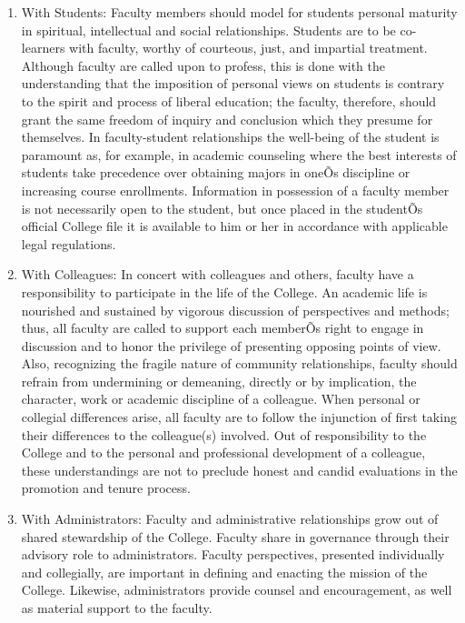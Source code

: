 \documentclass[letterpaper, 11pt]{article}
\begin{document}
				\begin{enumerate}[label=\alph*)]
					\item{With Students:  Faculty members should model for students personal maturity in spiritual, intellectual and social relationships.  Students are to be co-learners with faculty, worthy of courteous, just, and impartial treatment.  Although faculty are called upon to profess, this is done with the understanding that the imposition of personal views on students is contrary to the spirit and process of liberal education; the faculty, therefore, should grant the same freedom of inquiry and conclusion which they presume for themselves.  In faculty-student relationships the well-being of the student is paramount as, for example, in academic counseling where the best interests of students take precedence over obtaining majors in oneÕs discipline or increasing course enrollments.  Information in possession of a faculty member is not necessarily open to the student, but once placed in the studentÕs official College file it is available to him or her in accordance with applicable legal regulations.}
					\item{With Colleagues:  In concert with colleagues and others, faculty have a responsibility to participate in the life of the College.  An academic life is nourished and sustained by vigorous discussion of perspectives and methods; thus, all faculty are called to support each memberÕs right to engage in discussion and to honor the privilege of presenting opposing points of view.  Also, recognizing the fragile nature of community relationships, faculty should refrain from undermining or demeaning, directly or by implication, the character, work or academic discipline of a colleague. When personal or collegial differences arise, all faculty are to follow the injunction of first taking their differences to the colleague(s) involved.  Out of responsibility to the College and to the personal and professional development of a colleague, these understandings are not to preclude honest and candid evaluations in the promotion and tenure process.}
					\item{With Administrators:  Faculty and administrative relationships grow out of shared stewardship of the College.  Faculty share in governance through their advisory role to administrators.  Faculty perspectives, presented individually and collegially, are important in defining and enacting the mission of the College.  Likewise, administrators provide counsel and encouragement, as well as material support to the faculty.}

\end{enumerate}
\end{document}
